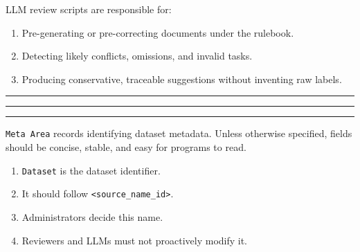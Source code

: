 \begin{tcolorbox}
\noindent LLM review scripts are responsible for:\par\smallskip

\begin{enumerate}[leftmargin=1.5em,noitemsep,topsep=2pt]
\item Pre-generating or pre-correcting documents under the rulebook.
\item Detecting likely conflicts, omissions, and invalid tasks.
\item Producing conservative, traceable suggestions without inventing raw labels.
\end{enumerate}

\par\bigskip
\noindent\rule{\linewidth}{0.8pt}\par\nopagebreak
{}\par\nopagebreak
\noindent\rule{\linewidth}{0.8pt}\par\smallskip

\medskip{}
\par\nopagebreak\noindent\rule{\linewidth}{0.4pt}\par\smallskip

\smallskip{}\par\smallskip

\noindent \texttt{Meta Area} records identifying dataset metadata. Unless otherwise specified, fields should be concise, stable, and easy for programs to read.\par\smallskip

\smallskip{}\par\smallskip

\begin{enumerate}[leftmargin=1.5em,noitemsep,topsep=2pt]
\item \texttt{Dataset} is the dataset identifier.
\item It should follow \texttt{<source\_name\_id>}.
\item Administrators decide this name.
\item Reviewers and LLMs must not proactively modify it.
\end{enumerate}

\smallskip{}\par\smallskip


\end{tcolorbox}

